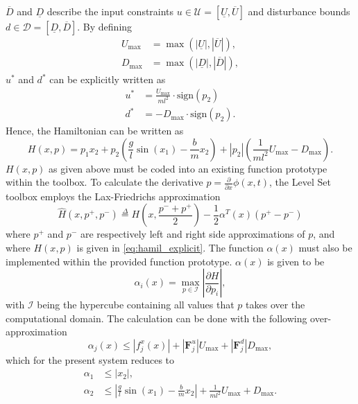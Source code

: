 \documentclass[../main.tex]{subfiles}
\begin{document}
$\overline{D}$ and $\underline{D}$ describe the input constraints $u\in \mathcal{U} = [\underline{U},\overline{U}]$ and disturbance bounds $d\in \mathcal{D} = [\underline{D},\overline{D}]$. By defining 
\begin{align}
    U_{\text{max}} &= \max(|\underline{U}|,|\overline{U}|), \\
    D_{\text{max}} &= \max(|\underline{D}|,|\overline{D}|), 
\end{align} 
$u^*$ and $d^*$ can be explicitly written as
\begin{align}
    u^* &= \frac{U_{\text{max}}}{ml^2} \cdot \text{sign}(p_2)\\
    d^* &= -D_{\text{max}} \cdot \text{sign}(p_2).
\end{align}
Hence, the Hamiltonian can be written as
\begin{equation}\label{eq:hamil_explicit}
    H(x,p) = p_1x_2+p_2\left(\frac{g}{l}\sin(x_1)-\frac{b}{m}x_2\right)+|p_2|\left(\frac{1}{ml^2}U_{\text{max}}-D_{\text{max}}\right).
\end{equation}
$H(x,p)$ as given above must be coded into an existing function prototype within the toolbox.
To calculate the derivative $p = \frac{\partial}{\partial x} \phi(x,t)$, the Level Set toolbox employs the Lax-Friedrichs approximation 
\begin{equation}
    \widehat{H}(x,p^+,p^-) \overset{\Delta}{=} H\left(x,\frac{p^-+p^+}{2}\right) - \frac{1}{2} \alpha^T(x)(p^+-p^-)
\end{equation}
where $p^+$ and $p^-$ are respectively left and right side approximations of $p$, and where $H(x,p)$ is given in \eqref{eq:hamil_explicit}. The function $\alpha(x)$ must also be implemented within the provided function prototype. $\alpha(x)$ is given to be
\begin{equation}
    \alpha_i(x) = \max_{p\in\mathcal{I}} \left|\frac{\partial H}{\partial p_i}\right|,
\end{equation}
with $\mathcal{I}$ being the hypercube containing all values that $p$ takes over the computational domain. The calculation can be done with the following over-approximation
\begin{equation}
    \alpha_j(x) \leq |f_j^x(x)| + |\textbf{F}_j^u|U_{\text{max}} + |\textbf{F}_j^d|D_{\text{max}}, 
\end{equation}
which for the present system reduces to 
\begin{align}
    \alpha_1 &\leq |x_2|,\\
    \alpha_2 &\leq \left|\frac{g}{l}\sin(x_1)-\frac{b}{m}x_2\right| + \frac{1}{ml^2}U_{\text{max}} + D_{\text{max}}.
\end{align}
\end{document}
